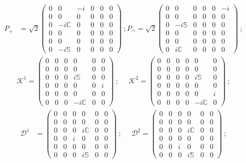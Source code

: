 \documentclass[journal,article,submit,pdftex,moreauthors]{Definitions/mdpi}
\begin{document}
    \begin{align}
     P_{\hat{+}}&=\sqrt{2}\begin{pmatrix}
        0&0&-i&0&0&0\\
        0&0&0&0&0&0\\
        0&-i\mathbb{C}&0&0&0&0\\
        0&0&0&0&0&0\\
        0&0&0&0&0&0\\
        0&-i\mathbb{S}&0&0&0&0
    \end{pmatrix}~;P_{\hat{-}}=\sqrt{2}\begin{pmatrix}
        0&0&0&0&0&-i\\
        0&0&0&0&0&0\\
        0&-i\mathbb{S}&0&0&0&0\\
        0&0&0&0&0&0\\
        0&0&0&0&0&0\\
        0&i\mathbb{C}&0&0&0&0
    \end{pmatrix}~;\nonumber
    \end{align}
    \begin{align}
        \mathcal{K}^{1}=\begin{pmatrix}
        0&0&0&0&0&0\\
        0&0&0&0&0&0\\
        0&0&0&i\mathbb{S}&0&0\\
        0&0&0&0&0&i\\
        0&0&0&0&0&0\\
        0&0&0&-i\mathbb{C}&0&0
    \end{pmatrix}~;~~~~~~\mathcal{K}^{2}=\begin{pmatrix}
        0&0&0&0&0&0\\
        0&0&0&0&0&0\\
        0&0&0&0&i\mathbb{S}&0\\
        0&0&0&0&0&0\\
        0&0&0&0&0&i\\
        0&0&0&0&-i\mathbb{C}&0
    \end{pmatrix}~;\nonumber
    \end{align}
    \begin{align}
    \mathcal{D}^{1}&=\begin{pmatrix}
        0&0&0&0&0&0\\
        0&0&0&0&0&0\\
        0&0&0&i\mathbb{C}&0&0\\
        0&0&i&0&0&0\\
        0&0&0&0&0&0\\
        0&0&0&i\mathbb{S}&0&0
    \end{pmatrix}~;~~~~~~\mathcal{D}^{2}=\begin{pmatrix}
        0&0&0&0&0&0\\
        0&0&0&0&0&0\\
        0&0&0&i\mathbb{C}&0&0\\
        0&0&0&0&0&0\\
        0&0&i&0&0&0\\
        0&0&0&i\mathbb{S}&0&0
    \end{pmatrix}~;\nonumber
    \end{align}
\end{document}
